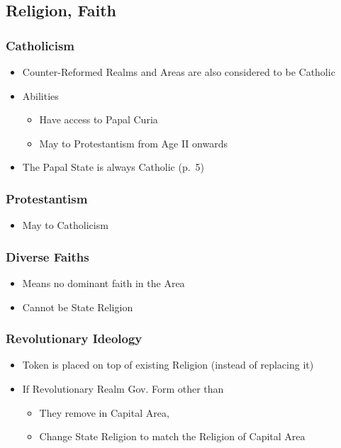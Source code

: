 \documentclass[10pt]{article}
\begin{document}
\subsection*{Religion, Faith }
\subsubsection*{Catholicism}
\begin{itemize}
	\item Counter-Reformed Realms and Areas are also considered to be Catholic
	\item Abilities
	\begin{itemize}
		\item Have access to Papal Curia
		\item May  to Protestantism from Age II onwards
	\end{itemize}
	\item The Papal State is always Catholic (p.~5)
\end{itemize}

\subsubsection*{Protestantism}
\begin{itemize}
	\item May  to Catholicism
\end{itemize}

\subsubsection*{Diverse Faiths}
\begin{itemize}
	\item Means no dominant faith in the Area
	\item Cannot be State Religion
\end{itemize}

\subsubsection*{Revolutionary Ideology}
\begin{itemize}
	\item Token is placed on top of existing Religion (instead of replacing it)
	\item If Revolutionary Realm  Gov. Form other than 
	\begin{itemize}
		\item They remove \revolution in Capital Area, 
		\item Change State Religion to match the Religion of Capital Area
	\end{itemize}
\end{itemize}
\end{document}
